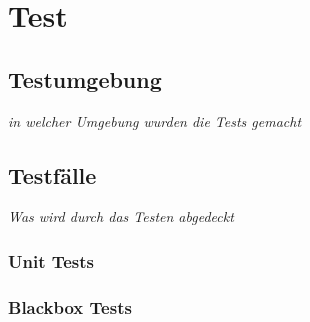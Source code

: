 \section{Test}
		\subsection{Testumgebung}
			\textit{in welcher Umgebung wurden die Tests gemacht}
		\subsection{Testfälle}
			\textit{Was wird durch das Testen abgedeckt}
			\subsubsection{Unit Tests}
			\subsubsection{Blackbox Tests}